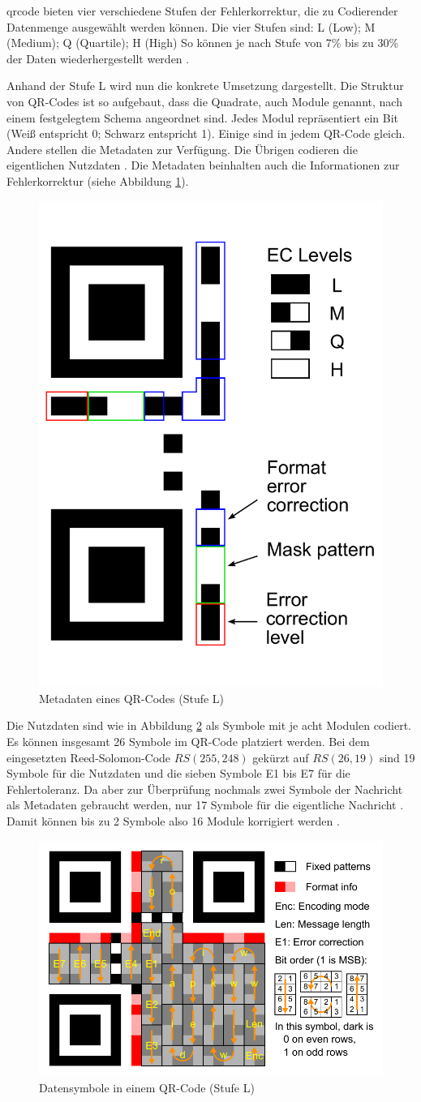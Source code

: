 \acrshort{qrcode} bieten vier verschiedene Stufen der Fehlerkorrektur, die zu Codierender Datenmenge ausgewählt werden können. 
Die vier Stufen sind: L (Low); M (Medium); Q (Quartile); H (High)
So können je nach Stufe von 7\% bis zu 30\% der Daten wiederhergestellt werden \cite{tiwariIntroductionQRCode2016}.

Anhand der Stufe L wird nun die konkrete Umsetzung dargestellt.
Die Struktur von QR-Codes ist so aufgebaut, dass die Quadrate, auch Module genannt, nach einem festgelegtem Schema angeordnet sind.
Jedes Modul repräsentiert ein Bit (Weiß entspricht 0; Schwarz entspricht 1).
Einige sind in jedem QR-Code gleich. Andere stellen die Metadaten zur Verfügung.
Die Übrigen codieren die eigentlichen Nutzdaten \cite{tiwariIntroductionQRCode2016}.
Die Metadaten beinhalten auch die Informationen zur Fehlerkorrektur (siehe Abbildung \ref{fig:qrschema}).
\begin{figure}[ht]
	\centering
	\includegraphics[height=0.4\textwidth]{figures/QR_Format_Information.pdf}
	\caption{Metadaten eines QR-Codes (Stufe L) \cite{QRCode2024}}
	\label{fig:qrschema}
\end{figure}
Die Nutzdaten sind wie in Abbildung \ref{fig:qrdata} als Symbole mit je acht Modulen codiert.
Es können insgesamt 26 Symbole im QR-Code platziert werden.
Bei dem eingesetzten Reed-Solomon-Code $RS(255,248)$ gekürzt auf $RS(26,19)$ sind 19 Symbole für die Nutzdaten und die sieben Symbole E1 bis E7 für die Fehlertoleranz.
Da aber zur Überprüfung nochmals zwei Symbole der Nachricht als Metadaten gebraucht werden, nur 17 Symbole für die eigentliche Nachricht \cite{pillazoHowDecodeQR2013}.
Damit können bis zu 2 Symbole also 16 Module korrigiert werden \cite{QRCode2024}.
\begin{figure}[ht]
	\centering
	\includegraphics[height=0.4\textwidth]{figures/QR_Character_Placement.pdf}
	\caption{Datensymbole in einem QR-Code (Stufe L) \cite{QRCode2024}}
	\label{fig:qrdata}
\end{figure}

